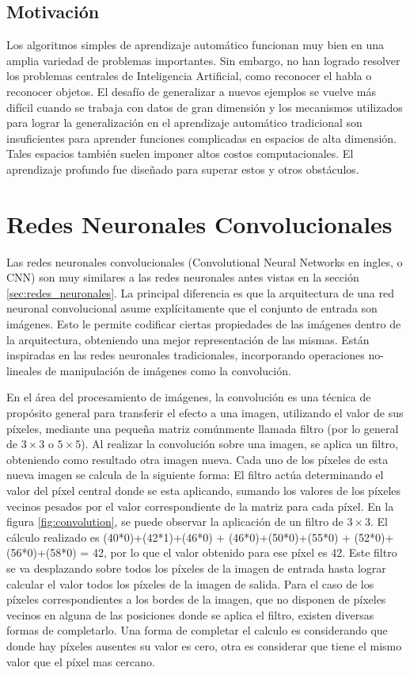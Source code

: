 \documentclass[a4paper,11pt,spanish]{book}
\begin{document}
    \subsection {Motivación}
      Los algoritmos simples de aprendizaje automático funcionan muy bien en una amplia variedad de problemas importantes.
      Sin embargo, no han logrado resolver los problemas centrales de Inteligencia Artificial, como reconocer el habla o reconocer objetos.
      El desafío de generalizar a nuevos ejemplos se vuelve más difícil cuando se trabaja con datos de gran dimensión y los mecanismos utilizados para lograr la generalización
      en el aprendizaje  automático tradicional son insuficientes para aprender funciones complicadas en espacios de alta dimensión.
      Tales espacios también suelen imponer altos costos computacionales. El aprendizaje profundo fue diseñado para superar estos y otros obstáculos.
\fi
  \section {Redes Neuronales Convolucionales} \label{sec:redes_convolucionales}
      Las redes neuronales convolucionales (Convolutional Neural Networks en ingles, o CNN) son muy similares a las redes neuronales antes vistas en la 
      sección \ref{sec:redes_neuronales}.
      La principal diferencia es que la arquitectura de una red neuronal convolucional asume explícitamente que el conjunto de entrada son imágenes. 
      Esto le permite codificar ciertas propiedades de las imágenes dentro de la arquitectura, obteniendo una mejor representación de las mismas.
      Están inspiradas en las redes neuronales tradicionales, incorporando operaciones no-lineales de manipulación de imágenes como la convolución.
      
      En el área del procesamiento de imágenes, la convolución es una técnica de propósito general para transferir el efecto a una imagen, utilizando el valor de sus píxeles,
      mediante una pequeña matriz comúnmente llamada filtro (por lo general de $3\times3$ o $5\times5$).
      Al realizar la convolución sobre una imagen, se aplica un filtro, obteniendo como resultado otra imagen nueva. Cada uno de los píxeles de esta nueva imagen se 
      calcula de la siguiente forma:
      El filtro actúa determinando el valor del píxel central donde se esta aplicando, sumando los valores de los píxeles vecinos pesados por el valor correspondiente de la matriz para
      cada píxel. En la figura \ref{fig:convolution}, se puede observar la aplicación de un filtro de $3\times3$. El cálculo realizado es (40*0)+(42*1)+(46*0) + (46*0)+(50*0)+(55*0) + (52*0)+(56*0)+(58*0) = 42,
      por lo que el valor obtenido para ese píxel es 42.
      Este filtro se va desplazando sobre todos los píxeles de la imagen de entrada hasta lograr calcular el valor todos los píxeles de la imagen de salida. 
      Para el caso de los píxeles correspondientes a los bordes de la imagen, que no disponen de píxeles vecinos en alguna de las posiciones donde se aplica el filtro, 
      existen diversas formas de completarlo. 
      Una forma de completar el calculo es considerando que donde hay píxeles ausentes su valor es cero, otra es considerar que tiene el mismo valor que el píxel mas cercano.
      
\end{document}
